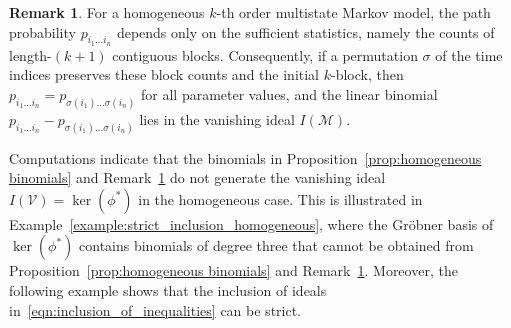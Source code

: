 \documentclass[11pt, a4paper]{article}
\numberwithin{equation}{section}
\theoremstyle{plain}
\theoremstyle{definition}
\newtheorem{remark}[theorem]{Remark}
\begin{document}
\begin{remark}\label{rem:linear}
For a homogeneous $k$-th order multistate Markov model, the path probability
$p_{i_1\ldots i_n}$ depends only on the sufficient statistics, namely the counts
of length-$(k+1)$ contiguous blocks.
Consequently, if a permutation $\sigma$ of the time indices preserves these
block counts and the initial $k$-block, then
$p_{i_1\ldots i_n}=p_{\sigma(i_1)\ldots\sigma(i_n)}$
for all parameter values, and the linear binomial
$p_{i_1\ldots i_n}-p_{\sigma(i_1)\ldots\sigma(i_n)}$ lies in the vanishing ideal
$I(\mathcal{M})$.
\end{remark}


Computations indicate that the binomials in
Proposition~\ref{prop:homogeneous binomials} and Remark~\ref{rem:linear}
do not generate the vanishing ideal $I(\mathcal {V})=\ker(\phi^*)$ in the homogeneous case. This is illustrated in  Example~\ref{example:strict_inclusion_homogeneous}, where the Gr\"obner basis of $\ker(\phi^*)$ contains binomials of degree three that cannot be obtained from Proposition~\ref{prop:homogeneous binomials} and Remark~\ref{rem:linear}.
Moreover, the following example shows that the
inclusion of ideals in~\eqref{eqn:inclusion_of_inequalities}  can be strict.
\end{document}
